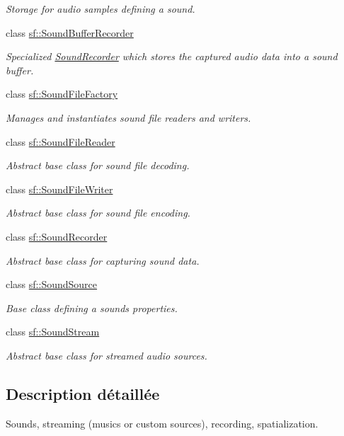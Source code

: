 \begin{DoxyCompactItemize}
\begin{DoxyCompactList}\small\item\em Storage for audio samples defining a sound. \end{DoxyCompactList}\item 
class \hyperlink{classsf_1_1SoundBufferRecorder}{sf\+::\+Sound\+Buffer\+Recorder}
\begin{DoxyCompactList}\small\item\em Specialized \hyperlink{classsf_1_1SoundRecorder}{Sound\+Recorder} which stores the captured audio data into a sound buffer. \end{DoxyCompactList}\item 
class \hyperlink{classsf_1_1SoundFileFactory}{sf\+::\+Sound\+File\+Factory}
\begin{DoxyCompactList}\small\item\em Manages and instantiates sound file readers and writers. \end{DoxyCompactList}\item 
class \hyperlink{classsf_1_1SoundFileReader}{sf\+::\+Sound\+File\+Reader}
\begin{DoxyCompactList}\small\item\em Abstract base class for sound file decoding. \end{DoxyCompactList}\item 
class \hyperlink{classsf_1_1SoundFileWriter}{sf\+::\+Sound\+File\+Writer}
\begin{DoxyCompactList}\small\item\em Abstract base class for sound file encoding. \end{DoxyCompactList}\item 
class \hyperlink{classsf_1_1SoundRecorder}{sf\+::\+Sound\+Recorder}
\begin{DoxyCompactList}\small\item\em Abstract base class for capturing sound data. \end{DoxyCompactList}\item 
class \hyperlink{classsf_1_1SoundSource}{sf\+::\+Sound\+Source}
\begin{DoxyCompactList}\small\item\em Base class defining a sound\textquotesingle{}s properties. \end{DoxyCompactList}\item 
class \hyperlink{classsf_1_1SoundStream}{sf\+::\+Sound\+Stream}
\begin{DoxyCompactList}\small\item\em Abstract base class for streamed audio sources. \end{DoxyCompactList}\end{DoxyCompactItemize}


\subsection{Description détaillée}
Sounds, streaming (musics or custom sources), recording, spatialization. 